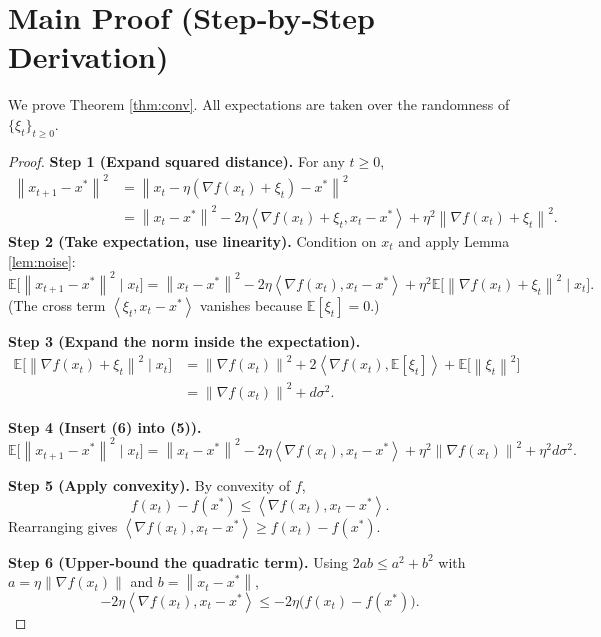 \documentclass{article}
\newcommand{\EE}{\mathbb{E}}
\newcommand{\norm}[1]{\left\lVert #1 \right\rVert}
\newcommand{\inner}[2]{\left\langle #1,#2 \right\rangle}
\begin{document}
\section*{Main Proof (Step‑by‑Step Derivation)}
We prove Theorem \ref{thm:conv}. All expectations are taken over the randomness of $\{\xi_{t}\}_{t\ge0}$.

\begin{proof}
\textbf{Step 1 (Expand squared distance).}  
For any $t\ge0$,
\[
\begin{aligned}
\norm{x_{t+1}-x^{\ast}}^{2}
&=\norm{x_{t}-\eta(\nabla f(x_{t})+\xi_{t})-x^{\ast}}^{2}\\
&=\norm{x_{t}-x^{\ast}}^{2}
-2\eta\inner{\nabla f(x_{t})+\xi_{t}}{x_{t}-x^{\ast}}
+\eta^{2}\norm{\nabla f(x_{t})+\xi_{t}}^{2}. \tag{4}
\end{aligned}
\]
\textbf{Step 2 (Take expectation, use linearity).}  
Condition on $x_{t}$ and apply Lemma \ref{lem:noise}:
\[
\EE\!\bigl[\norm{x_{t+1}-x^{\ast}}^{2}\mid x_{t}\bigr]
=\norm{x_{t}-x^{\ast}}^{2}
-2\eta\inner{\nabla f(x_{t})}{x_{t}-x^{\ast}}
+\eta^{2}\EE\!\bigl[\norm{\nabla f(x_{t})+\xi_{t}}^{2}\mid x_{t}\bigr]. \tag{5}
\]
(The cross term $\inner{\xi_{t}}{x_{t}-x^{\ast}}$ vanishes because $\EE[\xi_{t}]=0$.)

\textbf{Step 3 (Expand the norm inside the expectation).}
\[
\begin{aligned}
\EE\!\bigl[\norm{\nabla f(x_{t})+\xi_{t}}^{2}\mid x_{t}\bigr]
&=\norm{\nabla f(x_{t})}^{2}
+2\inner{\nabla f(x_{t})}{\EE[\xi_{t}]}
+\EE\!\bigl[\norm{\xi_{t}}^{2}\bigr] \\
&=\norm{\nabla f(x_{t})}^{2}+d\sigma^{2}. \tag{6}
\end{aligned}
\]

\textbf{Step 4 (Insert (6) into (5)).}
\[
\EE\!\bigl[\norm{x_{t+1}-x^{\ast}}^{2}\mid x_{t}\bigr]
=\norm{x_{t}-x^{\ast}}^{2}
-2\eta\inner{\nabla f(x_{t})}{x_{t}-x^{\ast}}
+\eta^{2}\norm{\nabla f(x_{t})}^{2}
+\eta^{2}d\sigma^{2}. \tag{7}
\]

\textbf{Step 5 (Apply convexity).}  
By convexity of $f$,
\[
f(x_{t})-f(x^{\ast})\le \inner{\nabla f(x_{t})}{x_{t}-x^{\ast}}. \tag{8}
\]
Rearranging gives $\inner{\nabla f(x_{t})}{x_{t}-x^{\ast}}\ge f(x_{t})-f(x^{\ast})$.

\textbf{Step 6 (Upper‑bound the quadratic term).}  
Using $2ab\le a^{2}+b^{2}$ with $a=\eta\norm{\nabla f(x_{t})}$ and $b=\norm{x_{t}-x^{\ast}}$,
\[
-2\eta\inner{\nabla f(x_{t})}{x_{t}-x^{\ast}}
\le -2\eta\bigl(f(x_{t})-f(x^{\ast})\bigr). \tag{9}
\]


\end{proof}
\end{document}
